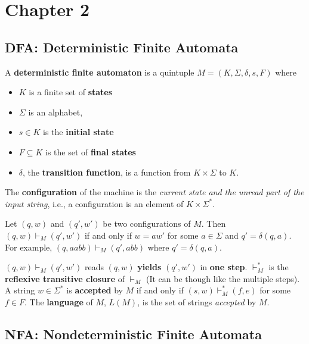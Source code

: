\newpage
\section{Chapter 2}

\begin{multicols}{2}
\setlength{\columnsep}{1.5cm}
\setlength{\columnseprule}{0.2pt}

\subsection{DFA: Deterministic Finite Automata}

\begin{definition}{}
  A \textbf{deterministic finite automaton} is a quintuple $M = (K, \Sigma, \delta, s, F)$ where
  \begin{itemize}
    \item $K$ is a finite set of \textbf{states}
    \item $\Sigma$ is an alphabet,
    \item $s \in K$ is the \textbf{initial state}
    \item $F \subseteq K$ is the set of \textbf{final states}
    \item $\delta$, the \textbf{transition function}, is a function from $K \times \Sigma$ to $K$. 
  \end{itemize}
\end{definition}

The \textbf{configuration} of the machine is the \textit{current state and the unread part of the input string}, i.e., a configuration is an element of $K \times \Sigma^*$.

Let $(q, w)$ and $(q',w')$ be two configurations of $M$. Then $(q, w) \vdash_M (q', w')$ if and only if $w = aw'$ for some $a \in \Sigma$ and $q' = \delta(q, a)$. For example, $(q, aabb) \vdash_M (q', abb)$ where $q' = \delta(q, a)$.

$(q, w) \vdash_M (q', w')$ reads $(q, w)$ \textbf{yields} $(q', w')$ in \textbf{one step}. $\vdash^*_M$ is the \textbf{reflexive transitive closure} of $\vdash_M$ (It can be though like the multiple steps). A string $w \in \Sigma^*$ is \textbf{accepted} by $M$ if and only if $(s, w) \vdash^*_M (f, e)$ for some $f \in F$. The \textbf{language} of $M$, $L(M)$, is the set of strings \textit{accepted} by $M$.

\vfill\null
\columnbreak


\subsection{NFA: Nondeterministic Finite Automata}


\end{multicols}
